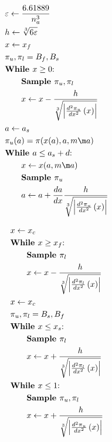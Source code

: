 \documentclass[12pt,letterpaper]{article}
\begin{document}
\begin{center}
   \begin{minipage}[t]{.45\textwidth}
      \begin{align*}
         &\varepsilon \gets \frac{6.61889}{n_a^3}\\
         &h\gets \sqrt[3]{6\varepsilon}\\
         &x \gets x_f\\
         &\pi_u,\pi_l=B_f,B_s\\
         &\textbf{While }x\ge0\text{:}\\
         &\qquad \textbf{Sample }\pi_u,\pi_l  \vspace{.5ex}\\
         &\qquad x \gets x-\frac{h}{\sqrt[3]{\left\lvert\frac{d^2{\pi_u}}{d{x}^2}\left(x\right)\right\rvert}}\\
         &a\gets a_s\\
         &\pi_u(a)=\pi(x(a),a,m\m a)\\
         &\textbf{While }a\le a_s+d\text{:}\\
         &\qquad x\gets x(a,m\m a)\\
         &\qquad \textbf{Sample } \pi_u\\
         &\qquad a \gets a+\frac{d{a}}{d{x}}\frac{h}{\sqrt[3]{\left\lvert\frac{d^2{\pi_u}}{d{x}^2}\left(x\right)\right\rvert}}
      \end{align*}
      \vspace{0pt}
   \end{minipage}
   \hfill
   \begin{minipage}[t]{.45\textwidth}
   \begin{align*}
      &x\gets x_c \\
      &\textbf{While }x\ge x_f\text{:}\\
      &\qquad \textbf{Sample } \pi_l\\
      &\qquad x \gets x-\frac{h}{\sqrt[3]{\left\lvert\frac{d^2{\pi_l}}{d{x}^2}\left(x\right)\right\rvert}}\\   
      &x\gets x_c \\
      &\pi_u,\pi_l=B_s,B_f\\
      &\textbf{While }x\le x_s\text{:}\\
      &\qquad \textbf{Sample } \pi_l\\
      &\qquad x \gets x+\frac{h}{\sqrt[3]{\left\lvert\frac{d^2{\pi_l}}{d{x}^2}\left(x\right)\right\rvert}}\\    
      &\textbf{While }x\le1\text{:}\\
      &\qquad \textbf{Sample }\pi_u,\pi_l  \vspace{.5ex}\\
      &\qquad x \gets x+\frac{h}{\sqrt[3]{\left\lvert\frac{d^2{\pi_u}}{d{x}^2}\left(x\right)\right\rvert}}   
   \end{align*}
   \vspace{0pt}
   \end{minipage}
\end{center}
\end{document}
